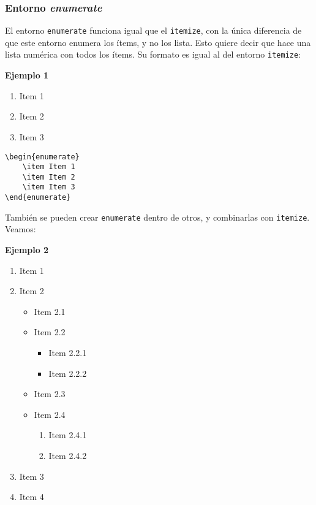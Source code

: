	
	\subsubsection{Entorno \textsl{enumerate}}
	
	El entorno \verb|enumerate| funciona igual que el \verb|itemize|, con la única diferencia de que este entorno enumera los ítems, y no los lista. Esto quiere decir que hace una lista numérica con todos los ítems. Su formato es igual al del entorno \verb|itemize|:
	
	\textbf{Ejemplo 1}
	
	\begin{enumerate}
		\item Item 1
		\item Item 2
		\item Item 3
	\end{enumerate}

	\begin{myquote}
		\begin{lstlisting}
\begin{enumerate}
	\item Item 1
	\item Item 2
	\item Item 3
\end{enumerate}
		\end{lstlisting}
	\end{myquote}
	
	
	También se pueden crear \verb|enumerate| dentro de otros, y combinarlas con \verb|itemize|. Veamos:
	
	\textbf{Ejemplo 2}
	
	\begin{enumerate}
		\item Item 1
		\item Item 2
		\begin{itemize}
			\item Item 2.1
			\item Item 2.2
			\begin{itemize}
				\item Item 2.2.1
				\item Item 2.2.2
			\end{itemize}
			\item Item 2.3
			\item Item 2.4
			\begin{enumerate}
				\item Item 2.4.1
				\item Item 2.4.2
			\end{enumerate}
		\end{itemize}
		\item Item 3
		\item Item 4
	\end{enumerate}

